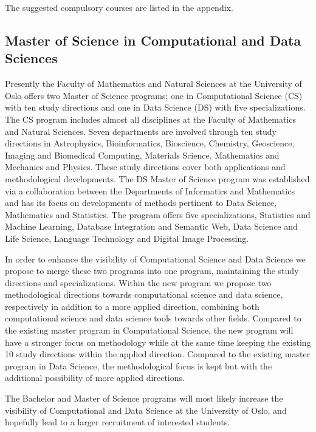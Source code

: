 \documentclass[oneside,final,10pt]{article}
\begin{document}
The suggested compulsory courses are listed in the appendix.

\subsection*{Master of Science in Computational and Data Sciences}

Presently the Faculty of Mathematics and Natural Sciences at the University of Oslo offers two Master of Science programs; one in Computational Science (CS) with ten study directions and one in Data Science (DS) with five specializations. The CS program includes almost all disciplines at the Faculty of Mathematics and Natural Sciences. Seven departments are involved through ten study directions in Astrophysics, Bioinformatics, Bioscience, Chemistry, Geoscience, Imaging and Biomedical Computing, Materials Science, Mathematics and Mechanics and Physics. These study directions cover both applications and methodological developments. The DS Master of Science program was established via a collaboration between the Departments of Informatics and Mathematics and has its focus on developments of methods pertinent to Data Science, Mathematics  and Statistics.  
The program offers five specializations, 
Statistics and Machine Learning, Database Integration and Semantic Web, 
Data Science and Life Science, Language Technology and Digital Image Processing. 


In order to enhance the visibility of Computational Science and Data Science we propose to merge these two programs into one program, maintaining the study directions and specializations. Within the new program we propose two methodological directions towards computational science and data science, respectively in addition to a more applied direction, combining both computational science and data science tools towards other fields. Compared to the existing master program in Computational Science, the new program will have a stronger focus on methodology while at the same time keeping the existing 10 study directions within the applied direction. Compared to the existing master program in Data Science, the methodological focus is kept but with the additional possibility of more applied directions.

The Bachelor and Master of Science programs
will most likely increase the visibility of Computational and Data Science at the University of Oslo, and hopefully lead to a larger recruitment of interested students. 

\end{document}
